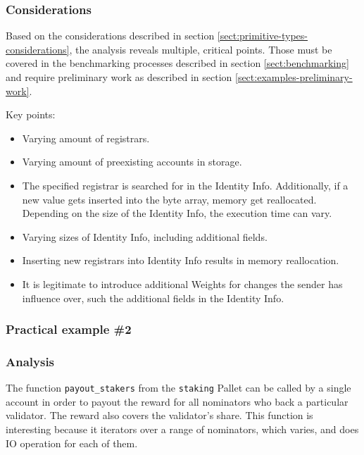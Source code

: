 \documentclass[11pt,a4paper]{article}
\begin{document}
\subsubsection*{Considerations}

Based on the considerations described in section \ref{sect:primitive-types-considerations},
the analysis reveals multiple, critical points. Those must be covered in the benchmarking
processes described in section \ref{sect:benchmarking} and require preliminary work as
described in section \ref{sect:examples-preliminary-work}.
\newline

Key points:
\begin{itemize}
  \item Varying amount of registrars.
  \item Varying amount of preexisting accounts in storage.
  \item The specified registrar is searched for in the Identity Info. Additionally, if a new value gets
  inserted into the byte array, memory get reallocated. Depending on the size of the Identity Info, the
  execution time can vary.
  \item Varying sizes of Identity Info, including additional fields.
  \item Inserting new registrars into Identity Info results in memory reallocation.
  \item It is legitimate to introduce additional Weights for changes the sender has influence over,
  such the additional fields in the Identity Info.
\end{itemize}

\subsubsection{Practical example \#2}

\subsubsection*{Analysis}

The function \verb|payout_stakers| from the \verb|staking| Pallet can be called by a single account in order
to payout the reward for all nominators who back a particular validator. The reward also covers the validator's
share. This function is interesting because it iterators over a range of nominators, which varies, and does
IO operation for each of them.
\newline
\end{document}
